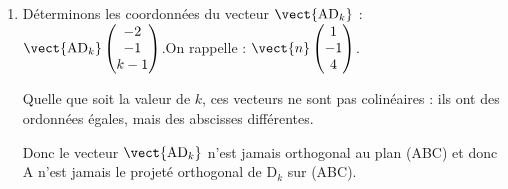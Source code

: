\begin{enumerate}
\begin{enumerate}
 		Seul le point $\mathrm{D}_{\frac54}$ est sur le plan (ABC).

 		Son projeté orthogonal sur (ABC) est alors lui-même, par  définition du projeté orthogonal.

		\item Déterminons les coordonnées du vecteur $\vect{\mathrm{AD}_k}$ : \quad $\vect{\mathrm{AD}_k} \begin{pmatrix} -2\\-1\\k-1 \end{pmatrix} $.\quad On rappelle : \quad $\vect{n} \begin{pmatrix} 1\\-1\\4 \end{pmatrix}$.

		Quelle que soit la valeur de $k$, ces vecteurs ne sont pas colinéaires : ils ont des ordonnées égales, mais des abscisses différentes.

		Donc le vecteur $\vect{\mathrm{AD}_k}$ n'est jamais orthogonal au plan (ABC) et donc A n'est jamais le projeté orthogonal de $\mathrm{D}_k$ sur (ABC).
	\end{enumerate}
\end{enumerate}
